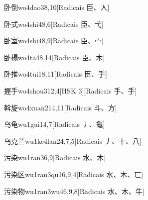 \begin{entry}{卧倒}{wo4dao3}{8,10}[Radicais ⾂、⼈]
\end{entry}

\begin{entry}{卧式}{wo4shi4}{8,6}[Radicais ⾂、⼷]
\end{entry}

\begin{entry}{卧室}{wo4shi4}{8,9}[Radicais ⾂、⼧]
\end{entry}

\begin{entry}{卧榻}{wo4ta4}{8,14}[Radicais ⾂、⽊]
\end{entry}

\begin{entry}{卧推}{wo4tui1}{8,11}[Radicais ⾂、⼿]
\end{entry}

\begin{entry}{握手}{wo4shou3}{12,4}[HSK 3][Radicais ⼿、⼿]
\end{entry}

\begin{entry}{斡旋}{wo4xuan2}{14,11}[Radicais ⽃、⽅]
\end{entry}

\begin{entry}{乌龟}{wu1gui1}{4,7}[Radicais ⼃、⿔]
\end{entry}

\begin{entry}{乌克兰}{wu1ke4lan2}{4,7,5}[Radicais ⼃、⼗、⼋]
\end{entry}

\begin{entry}{污染}{wu1ran3}{6,9}[Radicais ⽔、⽊]
\end{entry}

\begin{entry}{污染区}{wu1ran3qu1}{6,9,4}[Radicais ⽔、⽊、⼖]
\end{entry}

\begin{entry}{污染物}{wu1ran3wu4}{6,9,8}[Radicais ⽔、⽊、⽜]
\end{entry}

